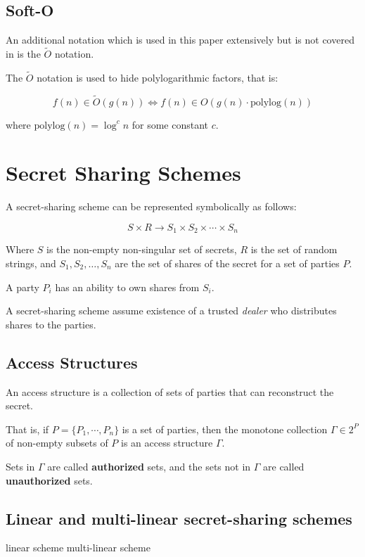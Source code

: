 \subsection{Soft-O}

An additional notation which is used in this paper extensively but is not covered in \cite{cormen2009introduction} is the $\tilde{O}$ notation.

The $\tilde{O}$ notation is used to hide polylogarithmic factors, that is:

\[
    f(n) \in \tilde{O}(g(n)) \Longleftrightarrow f(n) \in O(g(n) \cdot \text{polylog}(n))
\]

where $\text{polylog}(n) = \log^c n$ for some constant $c$.

\section{Secret Sharing Schemes}

A secret-sharing scheme can be represented symbolically as follows:

\[
    S \times R \rightarrow S_1 \times S_2 \times \cdots \times S_n
\]

Where $S$ is the non-empty non-singular set of secrets, $R$ is the set of random strings, and $S_1, S_2, \ldots, S_n$ are the set of shares of the secret for a set of parties $P$.

A party $P_i$ has an ability to own shares from $S_i$.

A secret-sharing scheme assume existence of a trusted \textit{dealer} who distributes shares to the parties.

\subsection{Access Structures}

An access structure is a collection of sets of parties that can reconstruct the secret.

That is, if $P = \{P_1, \cdots, P_n\}$ is a set of parties, then the monotone collection $\Gamma \in 2^P$ of non-empty subsets of $P$ is an access structure $\Gamma$.

Sets in $\Gamma$ are called \textbf{authorized} sets, and the sets not in $\Gamma$ are called \textbf{unauthorized} sets.

\subsection{Linear and multi-linear secret-sharing schemes}
linear scheme
multi-linear scheme

